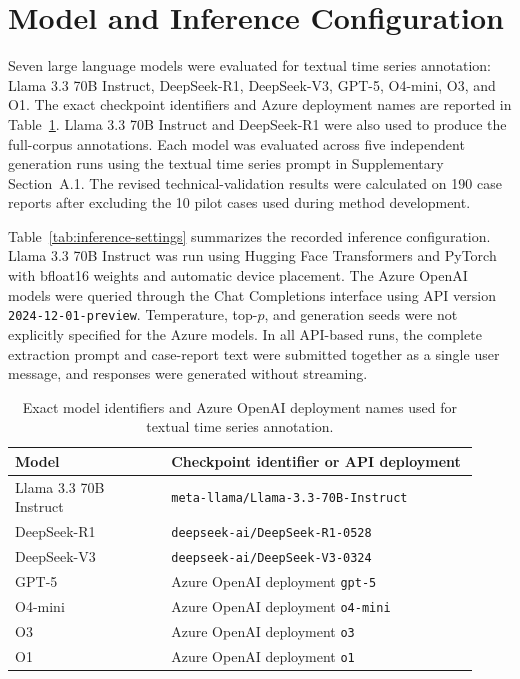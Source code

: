 \section{Model and Inference Configuration}
\label{sec:supp-model-configuration}

Seven large language models were evaluated for textual time series annotation:
Llama 3.3 70B Instruct, DeepSeek-R1, DeepSeek-V3, GPT-5, O4-mini, O3,
and O1. The exact checkpoint identifiers and Azure deployment names are
reported in Table~\ref{tab:model-identifiers}. Llama 3.3 70B Instruct and
DeepSeek-R1 were also used to produce the full-corpus annotations. Each model
was evaluated across five independent generation runs using the textual time
series prompt in Supplementary Section~A.1. The revised technical-validation
results were calculated on 190 case reports after excluding the 10 pilot cases
used during method development.

Table~\ref{tab:inference-settings} summarizes the recorded inference
configuration. Llama 3.3 70B Instruct was run using Hugging Face Transformers
and PyTorch with bfloat16 weights and automatic device placement. The Azure
OpenAI models were queried through the Chat Completions interface using API
version \texttt{2024-12-01-preview}. Temperature, top-$p$, and generation seeds
were not explicitly specified for the Azure models. In all API-based runs, the
complete extraction prompt and case-report text were submitted together as a
single user message, and responses were generated without streaming.

\begin{table}[tbp]
\centering
\caption{
Exact model identifiers and Azure OpenAI deployment names used for textual
time series annotation.
}
\label{tab:model-identifiers}
\scriptsize
\setlength{\tabcolsep}{6pt}
\renewcommand{\arraystretch}{1.15}
\begin{tabular}{p{0.31\linewidth} p{0.61\linewidth}}
\toprule
\textbf{Model} &
\textbf{Checkpoint identifier or API deployment} \\
\midrule

Llama 3.3 70B Instruct &
\texttt{meta-llama/Llama-3.3-70B-Instruct} \\

DeepSeek-R1 &
\texttt{deepseek-ai/DeepSeek-R1-0528} \\

DeepSeek-V3 &
\texttt{deepseek-ai/DeepSeek-V3-0324} \\

GPT-5 &
Azure OpenAI deployment \texttt{gpt-5} \\

O4-mini &
Azure OpenAI deployment \texttt{o4-mini} \\

O3 &
Azure OpenAI deployment \texttt{o3} \\

O1 &
Azure OpenAI deployment \texttt{o1} \\

\bottomrule
\end{tabular}
\end{table}

